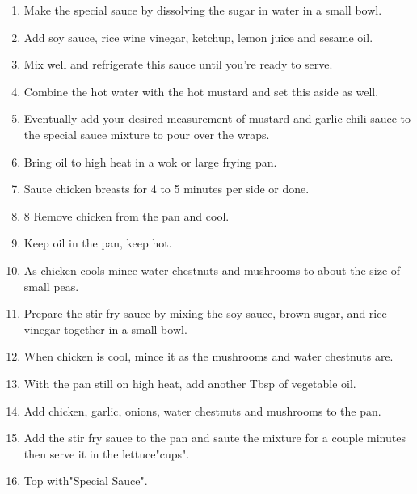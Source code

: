 \documentclass[11pt, twoside, openany]{book}
\begin{document}
\vspace{-3mm}\begin{enumerate}\setlength\itemsep{-1mm}
\item Make the special sauce by dissolving the sugar in water in a small bowl.
\item Add soy sauce, rice wine vinegar, ketchup, lemon juice and sesame oil.
\item Mix well and refrigerate this sauce until you're ready to serve.
\item Combine the hot water with the hot mustard and set this aside as well.
\item Eventually add your desired measurement of mustard and garlic chili sauce to the special sauce mixture to pour over the wraps.
\item Bring oil to high heat in a wok or large frying pan.
\item Saute chicken breasts for 4 to 5 minutes per side or done.
\item 8 Remove chicken from the pan and cool.
\item Keep oil in the pan, keep hot.
\item As chicken cools mince water chestnuts and mushrooms to about the size of small peas.
\item Prepare the stir fry sauce by mixing the soy sauce, brown sugar, and rice vinegar together in a small bowl.
\item When chicken is cool, mince it as the mushrooms and water chestnuts are.
\item With the pan still on high heat, add another Tbsp of vegetable oil.
\item Add chicken, garlic, onions, water chestnuts and mushrooms to the pan.
\item Add the stir fry sauce to the pan and saute the mixture for a couple minutes then serve it in the lettuce"cups".
\item Top with"Special Sauce".
\end{enumerate}
 \label{chili}\hfill\textit{}\\
\end{document}
